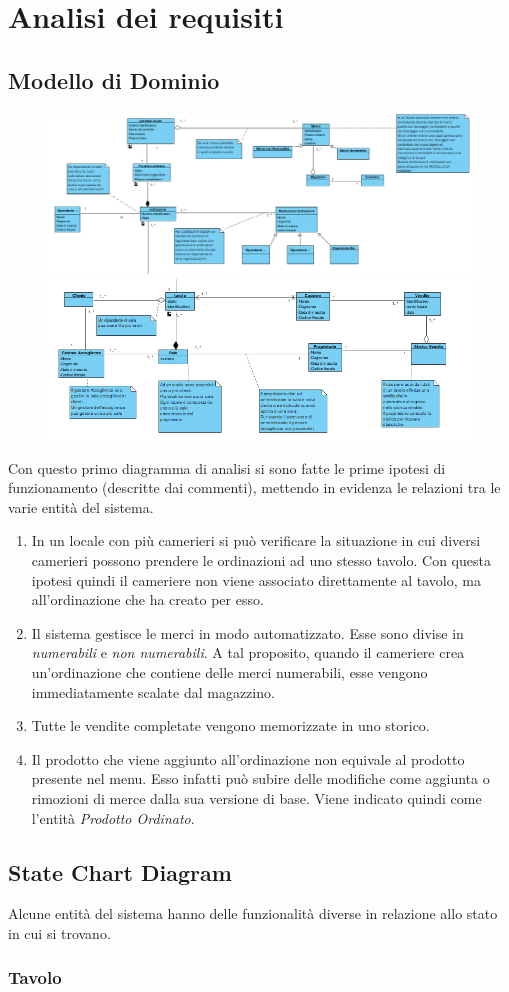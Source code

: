 \chapter{Analisi dei requisiti}
\label{analisi}

\section{Modello di Dominio}
\begin{figure}[H]
	\includegraphics[width=1\textwidth]{Immagini/ClassDiagramDominio1.png}
	\includegraphics[width=\textwidth]{Immagini/ClassDiagramDominio2.png}
\end{figure}
Con questo primo diagramma di analisi si sono fatte le prime ipotesi di funzionamento (descritte dai commenti), mettendo in evidenza le relazioni tra le varie entità del sistema.

\begin{enumerate}
	\item In un locale con più camerieri si può verificare la situazione in cui diversi camerieri possono prendere le ordinazioni ad uno stesso tavolo. Con questa ipotesi quindi il cameriere non viene associato direttamente al tavolo, ma all'ordinazione che ha creato per esso.
	\item Il sistema gestisce le merci in modo automatizzato. Esse sono divise in \textit{numerabili} e \textit{non numerabili}. A tal proposito, quando il cameriere crea un'ordinazione che contiene delle merci numerabili, esse vengono immediatamente scalate dal magazzino.
	\item Tutte le vendite completate vengono memorizzate in uno storico.
	\item Il prodotto che viene aggiunto all'ordinazione non equivale al prodotto presente nel menu. Esso infatti può subire delle modifiche come aggiunta o rimozioni di merce dalla sua versione di base. Viene indicato quindi come l'entità \textit{Prodotto Ordinato}.
\end{enumerate}

\section{State Chart Diagram}
Alcune entità del sistema hanno delle funzionalità diverse in relazione allo stato in cui si trovano.

\subsection{Tavolo}


